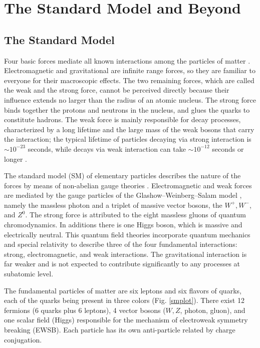 \chapter{The Standard Model and Beyond}

\section{The Standard Model}

Four basic forces mediate all known interactions among the particles of matter \cite{t_hooft_gauge_1980}. Electromagnetic and gravitational are infinite range forces, so they are familiar to everyone for their macroscopic effects. The two remaining forces, which are called the weak and the strong force, cannot be perceived directly because their influence extends no larger than the radius of an atomic nucleus. The strong force binds together the protons and neutrons in the nucleus, and glues the quarks to constitute hadrons. The weak force is mainly responsible for decay processes, characterized by a long lifetime and the large mass of the weak bosons that carry the interaction; the typical lifetime of particles decaying via strong interaction is $\sim 10^{-23}$ seconds, while decays via weak interaction can take $\sim 10^{-12}$ seconds or longer \cite{Halzen:1984mc}.

The standard model (SM) \cite{Novaes:1999yn} of elementary particles describes the nature of the forces by means of non-abelian gauge theories \cite{Quigg:2013ufa}. Electromagnetic and weak forces are mediated by the gauge particles of the Glashow--Weinberg--Salam model \cite{Glashow:1961tr}, namely the massless photon and a triplet of massive vector bosons, the $W^+,W^{-}$, and $Z^0$. The strong force is attributed to the eight massless gluons of quantum chromodynamics. In additions there is one Higgs boson, which is massive and electrically neutral. This quantum field theories incorporate quantum mechanics and special relativity to describe three of the four fundamental interactions: strong, electromagnetic, and weak interactions. The gravitational interaction is far weaker and is not expected to contribute significantly to any processes at subatomic level.

The fundamental particles  of matter are six leptons and six flavors of quarks, each of the quarks being present in three colors (Fig. \ref{smplot}). There exist 12 fermions (6 quarks plus 6 leptons), 4 vector bosons ($W, Z$, photon, gluon), and one scalar field (Higgs) responsible for the mechanism of electroweak symmetry breaking (EWSB). Each particle has its own anti-particle related by charge conjugation. 

